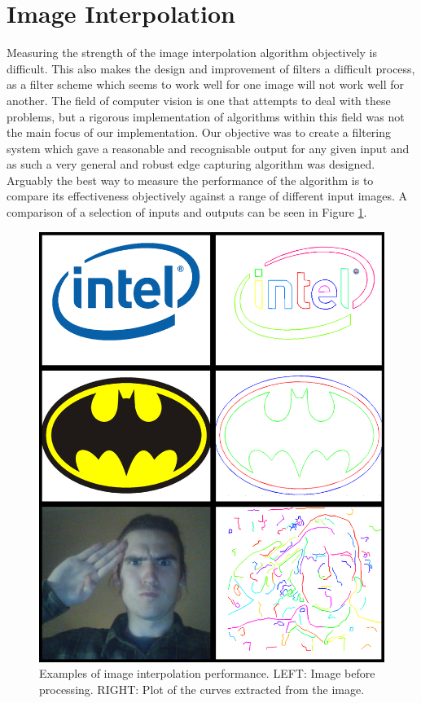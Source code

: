 \section{Image Interpolation}
Measuring the strength of the image interpolation algorithm objectively is difficult. This also makes the design and improvement of filters a difficult process, as a filter scheme which seems to work well for one image will not work well for another. The field of computer vision is one that attempts to deal with these problems, but a rigorous implementation of algorithms within this field was not the main focus of our implementation. Our objective was to create a filtering system which gave a reasonable and recognisable output for any given input and as such a very general and robust edge capturing algorithm was designed. Arguably the best way to measure the performance of the algorithm is to compare its effectiveness objectively against a range of different input images. A comparison of a selection of inputs and outputs can be seen in Figure \ref{fig:imageInterpolation}.

\begin{figure}[htbp]  
\includegraphics[width=\textwidth]{figures/performance/imageInterpolation.png}
\caption[Examples of image interpolation performance]{Examples of image interpolation performance. LEFT: Image before processing. RIGHT: Plot of the curves extracted from the image.
\label{fig:imageInterpolation}}
\end{figure}

